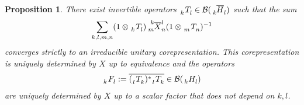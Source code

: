 \documentclass[11pt]{article}
\newcommand{\Gr}[5]{\,\tensor*[^{#2}_{#4}]{#1}{^{#3}_{#5}}}%
\newcommand{\Grd}[3]{\Gr{#1}{}{}{#2}{#3}}
\newtheorem{Prop}[Theorem]{Proposition}
\theoremstyle{definition}
\numberwithin{equation}{section}
\begin{document}
\begin{Prop} \label{prop:corep-dual}
There exist invertible operators $\Grd{T}{k}{l} \in \mathcal{B}(\Grd{\overline{H}}{k}{l})$ such that the sum
\begin{align} \label{eq:dual}
   \sum_{k,l,m,n} (1\otimes \Grd{T}{k}{l}) \Gr{\overline{X}}{k}{l}{m}{n} (1 \otimes
  \Grd{T}{m}{n})^{-1}
\end{align}
converges strictly to an irreducible unitary corepresentation. This corepresentation is uniquely
determined by $X$ up to equivalence and the operators 
\begin{align*} 
  \Grd{F}{k}{l} := \overline{(\Grd{T}{l}{k})^{*}\Grd{T}{l}{k}} \in \mathcal{B}(\Grd{H}{k}{l})
\end{align*}
are uniquely determined by $X$ up to a scalar factor that does not depend on $k,l$.
\end{Prop}
\end{document}
